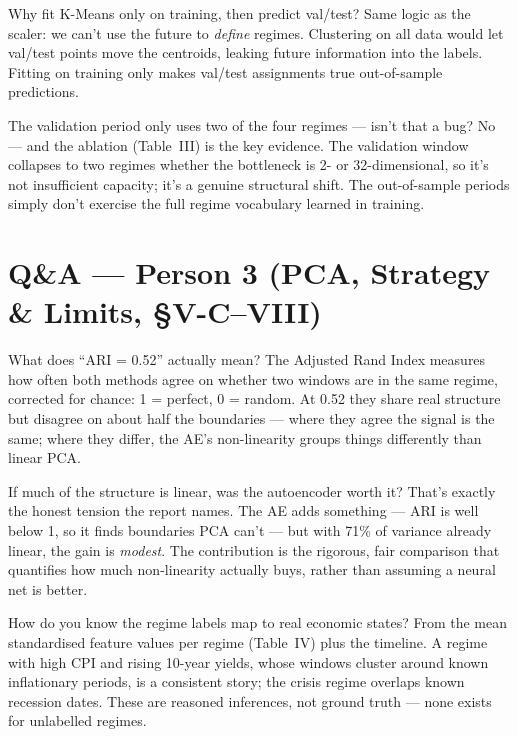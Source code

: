 \documentclass[11pt]{article}
\newcommand{\setp}[2]{\colorlet{accent}{#1}\colorlet{accentl}{#2}}
\begin{document}
\begin{qa}{Why fit K-Means only on training, then predict val/test?}
Same logic as the scaler: we can't use the future to \emph{define} regimes.
Clustering on all data would let val/test points move the centroids, leaking future
information into the labels. Fitting on training only makes val/test assignments true
out-of-sample predictions.
\end{qa}

\begin{qa}{The validation period only uses two of the four regimes --- isn't that a bug?}
No --- and the ablation (Table~III) is the key evidence. The validation window
collapses to two regimes whether the bottleneck is 2- or 32-dimensional, so it's not
insufficient capacity; it's a genuine structural shift. The out-of-sample periods
simply don't exercise the full regime vocabulary learned in training.
\end{qa}

\setp{p3}{p3l}
\section{Q\&A — Person 3 (PCA, Strategy \& Limits, §V-C–VIII)}

\begin{qa}{What does ``ARI = 0.52'' actually mean?}
The Adjusted Rand Index measures how often both methods agree on whether two windows
are in the same regime, corrected for chance: 1 = perfect, 0 = random. At 0.52 they
share real structure but disagree on about half the boundaries --- where they agree
the signal is the same; where they differ, the AE's non-linearity groups things
differently than linear PCA.
\end{qa}

\begin{qa}{If much of the structure is linear, was the autoencoder worth it?}
That's exactly the honest tension the report names. The AE adds something --- ARI is
well below 1, so it finds boundaries PCA can't --- but with 71\% of variance already
linear, the gain is \emph{modest}. The contribution is the rigorous, fair comparison
that quantifies how much non-linearity actually buys, rather than assuming a neural
net is better.
\end{qa}

\begin{qa}{How do you know the regime labels map to real economic states?}
From the mean standardised feature values per regime (Table~IV) plus the timeline. A
regime with high CPI and rising 10-year yields, whose windows cluster around known
inflationary periods, is a consistent story; the crisis regime overlaps known
recession dates. These are reasoned inferences, not ground truth --- none exists for
unlabelled regimes.
\end{qa}
\end{document}
